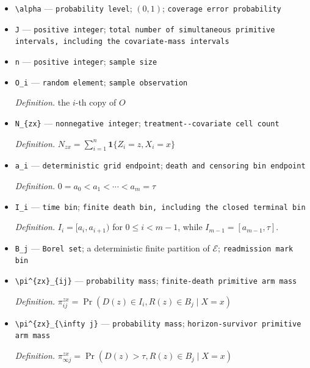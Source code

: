 \documentclass{article}
\begin{document}
\begin{itemize}
  \item \texttt{\textbackslash{}\allowbreak{}alpha} --- \texttt{probability level}; \((0,1)\); \texttt{coverage error probability}
  \item \texttt{J} --- \texttt{positive integer}; \texttt{total number of simultaneous primitive intervals,\allowbreak{} including the covariate-\allowbreak{}mass intervals}
  \item \texttt{n} --- \texttt{positive integer}; \texttt{sample size}
  \item \texttt{O\_\allowbreak{}i} --- \texttt{random element}; \texttt{sample observation}
  \par\smallskip\noindent\emph{Definition.} the \(i\)-th copy of \(O\)
  \item \texttt{N\_\allowbreak{}\{zx\}\allowbreak{}} --- \texttt{nonnegative integer}; \texttt{treatment-\allowbreak{}-\allowbreak{}covariate cell count}
  \par\smallskip\noindent\emph{Definition.} \(N_{zx}=\sum_{i=1}^n\mathbf 1\{Z_i=z,X_i=x\}\)
  \item \texttt{a\_\allowbreak{}i} --- \texttt{deterministic grid endpoint}; \texttt{death and censoring bin endpoint}
  \par\smallskip\noindent\emph{Definition.} \(0=a_0<a_1<\cdots<a_m=\tau\)
  \item \texttt{I\_\allowbreak{}i} --- \texttt{time bin}; \texttt{finite death bin,\allowbreak{} including the closed terminal bin}
  \par\smallskip\noindent\emph{Definition.} \(I_i=[a_i,a_{i+1})\) for \(0\leq i<m-1\), while \(I_{m-1}=[a_{m-1},\tau]\).
  \item \texttt{B\_\allowbreak{}j} --- \texttt{Borel set}; a deterministic finite partition of \(\mathcal E\); \texttt{readmission mark bin}
  \item \texttt{\textbackslash{}\allowbreak{}pi\textasciicircum{}\{zx\}\allowbreak{}\_\allowbreak{}\{ij\}\allowbreak{}} --- \texttt{probability mass}; \texttt{finite-\allowbreak{}death primitive arm mass}
  \par\smallskip\noindent\emph{Definition.} \(\pi^{zx}_{ij}=\Pr(D(z)\in I_i,R(z)\in B_j\mid X=x)\)
  \item \texttt{\textbackslash{}\allowbreak{}pi\textasciicircum{}\{zx\}\allowbreak{}\_\allowbreak{}\{\textbackslash{}\allowbreak{}infty j\}\allowbreak{}} --- \texttt{probability mass}; \texttt{horizon-\allowbreak{}survivor primitive arm mass}
  \par\smallskip\noindent\emph{Definition.} \(\pi^{zx}_{\infty j}=\Pr(D(z)>\tau,R(z)\in B_j\mid X=x)\)

\end{itemize}
\end{document}
